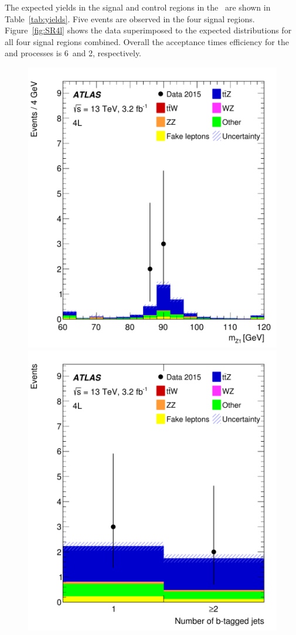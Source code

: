 The expected yields in the signal and control regions in the \FLC\ are shown
in Table~\ref{tab:yields}.  Five events are observed in the four signal
regions. Figure~\ref{fig:SR4l} shows the data superimposed to the expected
distributions for all four signal regions combined.
Overall the acceptance times efficiency for the \ttZ and \ttW
processes is 6\textperthousand\ and 2\textperthousand, respectively.  

\begin{figure}[htbp]
\centering
\includegraphics[width=\twofigwidth]{SR4lmll}
\includegraphics[width=\twofigwidth]{SR4lnBJets}

\end{figure}
